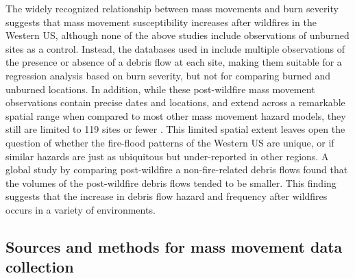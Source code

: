 \documentclass[nhess, manuscript]{copernicus}
\begin{document}
The widely recognized relationship between mass movements
and burn severity suggests that mass movement susceptibility
increases after wildfires in the Western US, although none of the
above studies include observations of unburned sites as a control.
Instead, the databases used in \citet{cannonPredictingProbabilityVolume2010, gartnerMutivariateStatisticalModels2009, gartnerEmpiricalModelsPredicting2014, rupertUsingLogisticRegression2003, staleyUpdatedLogisticRegression2016} include multiple
observations of the presence or absence of a debris flow at each site,
making them suitable for a regression analysis based on burn severity,
but not for comparing burned and unburned locations. In addition, while
these post-wildfire mass movement observations contain precise dates and locations, and extend
across a remarkable spatial range when compared to most other mass movement hazard
models, they still are limited to 119 sites or fewer \citep{gartnerEmpiricalModelsPredicting2014}. This limited spatial extent leaves open the question of whether
the fire-flood patterns of the Western US are unique, or if similar
hazards are just as ubiquitous but under-reported in other regions. A global study by \citet{riley2013frequency} comparing post-wildfire a non-fire-related 
debris flows found that the volumes of the post-wildfire debris flows tended to be smaller.
This finding suggests that the increase in debris flow hazard and frequency after wildfires occurs in a variety of environments.

\subsection{Sources and methods for mass movement data
collection}\label{sources-and-methods-for-mass-movement-data-collection}
\end{document}
